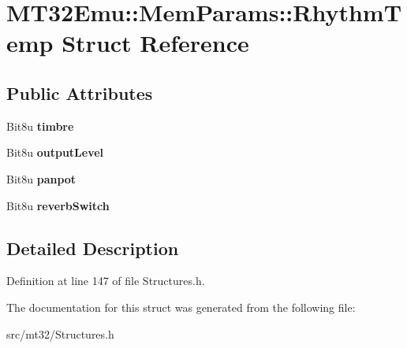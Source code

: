 \hypertarget{structMT32Emu_1_1MemParams_1_1RhythmTemp}{\section{M\-T32\-Emu\-:\-:Mem\-Params\-:\-:Rhythm\-Temp Struct Reference}
\label{structMT32Emu_1_1MemParams_1_1RhythmTemp}
}
\subsection*{Public Attributes}
\begin{DoxyCompactItemize}
\item 
\hypertarget{structMT32Emu_1_1MemParams_1_1RhythmTemp_a1d6682278e1898484f312e6cb344ff4e}{Bit8u {\bfseries timbre}}\label{structMT32Emu_1_1MemParams_1_1RhythmTemp_a1d6682278e1898484f312e6cb344ff4e}

\item 
\hypertarget{structMT32Emu_1_1MemParams_1_1RhythmTemp_a3de3d2e5815a1b5e9d6df7c5e9507e77}{Bit8u {\bfseries output\-Level}}\label{structMT32Emu_1_1MemParams_1_1RhythmTemp_a3de3d2e5815a1b5e9d6df7c5e9507e77}

\item 
\hypertarget{structMT32Emu_1_1MemParams_1_1RhythmTemp_a072e84a99573cf0424987dfe2a30472c}{Bit8u {\bfseries panpot}}\label{structMT32Emu_1_1MemParams_1_1RhythmTemp_a072e84a99573cf0424987dfe2a30472c}

\item 
\hypertarget{structMT32Emu_1_1MemParams_1_1RhythmTemp_a38627a50fdcd93757cabfce89732fe2a}{Bit8u {\bfseries reverb\-Switch}}\label{structMT32Emu_1_1MemParams_1_1RhythmTemp_a38627a50fdcd93757cabfce89732fe2a}

\end{DoxyCompactItemize}


\subsection{Detailed Description}


Definition at line 147 of file Structures.\-h.



The documentation for this struct was generated from the following file\-:\begin{DoxyCompactItemize}
\item 
src/mt32/Structures.\-h\end{DoxyCompactItemize}
